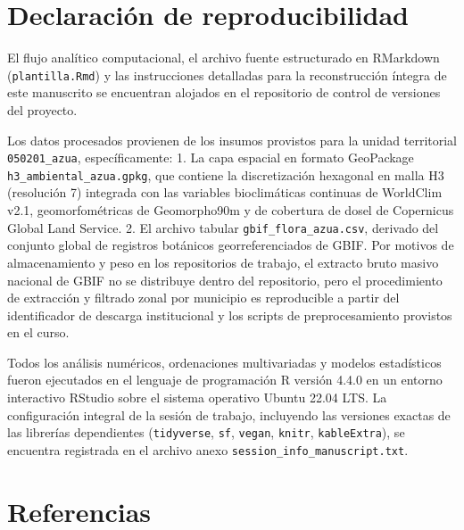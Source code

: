 \documentclass[
  12pt,
  man,
  floatsintext]{apa7}
\begin{document}
\section{Declaración de reproducibilidad}\label{declaraciuxf3n-de-reproducibilidad}

El flujo analítico computacional, el archivo fuente estructurado en RMarkdown (\texttt{plantilla.Rmd}) y las instrucciones detalladas para la reconstrucción íntegra de este manuscrito se encuentran alojados en el repositorio de control de versiones del proyecto.

Los datos procesados provienen de los insumos provistos para la unidad territorial \texttt{050201\_azua}, específicamente:
1. La capa espacial en formato GeoPackage \texttt{h3\_ambiental\_azua.gpkg}, que contiene la discretización hexagonal en malla H3 (resolución 7) integrada con las variables bioclimáticas continuas de WorldClim v2.1, geomorfométricas de Geomorpho90m y de cobertura de dosel de Copernicus Global Land Service.
2. El archivo tabular \texttt{gbif\_flora\_azua.csv}, derivado del conjunto global de registros botánicos georreferenciados de GBIF. Por motivos de almacenamiento y peso en los repositorios de trabajo, el extracto bruto masivo nacional de GBIF no se distribuye dentro del repositorio, pero el procedimiento de extracción y filtrado zonal por municipio es reproducible a partir del identificador de descarga institucional y los scripts de preprocesamiento provistos en el curso.

Todos los análisis numéricos, ordenaciones multivariadas y modelos estadísticos fueron ejecutados en el lenguaje de programación R versión 4.4.0 en un entorno interactivo RStudio sobre el sistema operativo Ubuntu 22.04 LTS. La configuración integral de la sesión de trabajo, incluyendo las versiones exactas de las librerías dependientes (\texttt{tidyverse}, \texttt{sf}, \texttt{vegan}, \texttt{knitr}, \texttt{kableExtra}), se encuentra registrada en el archivo anexo \texttt{session\_info\_manuscript.txt}.

\section*{Referencias}\label{referencias}
\end{document}
